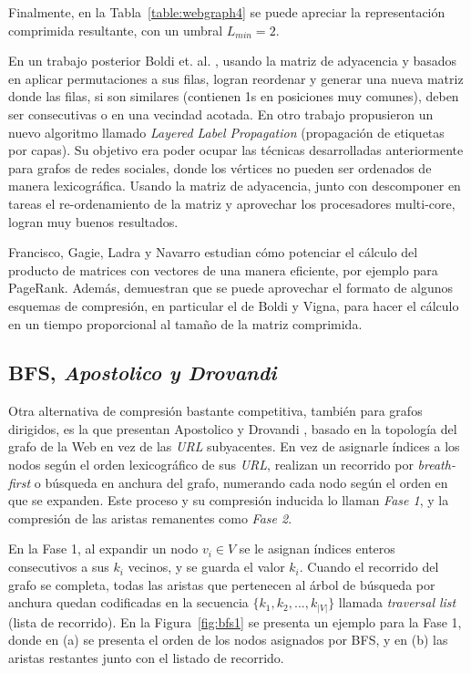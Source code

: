 Finalmente, en la Tabla~\ref{table:webgraph4} se puede apreciar la representación comprimida resultante, con un umbral $L_{min} = 2$. 

En un trabajo posterior Boldi et. al. \cite{boldi2009permuting}, usando la matriz de adyacencia y basados en aplicar permutaciones a sus filas, logran reordenar y generar una nueva matriz donde las filas, si son similares (contienen 1s en posiciones muy comunes), deben ser consecutivas o en una vecindad acotada. En otro trabajo propusieron un nuevo algoritmo llamado \textit{Layered Label Propagation} \cite{boldi2011layered} (propagación de etiquetas por capas). Su objetivo era poder ocupar las técnicas desarrolladas anteriormente para grafos de redes sociales, donde los vértices no pueden ser ordenados de manera lexicográfica. Usando la matriz de adyacencia, junto con descomponer en tareas el re-ordenamiento de la matriz y aprovechar los procesadores multi-core, logran muy buenos resultados.

Francisco, Gagie, Ladra y Navarro \cite{francisco2018exploiting} estudian cómo potenciar el cálculo del producto de matrices con vectores de una manera eficiente, por ejemplo para PageRank\cite{page1999pagerank}.  Además, demuestran que se puede aprovechar el formato de algunos esquemas de compresión, en particular el de Boldi y Vigna, para hacer el cálculo en un tiempo proporcional al tamaño de la matriz comprimida.


\subsection{BFS, \textit{Apostolico y Drovandi}}
Otra alternativa de compresión bastante competitiva, también para grafos dirigidos, es la que presentan Apostolico y Drovandi \cite{apostolico2009graph}, basado en la topología del grafo de la Web en vez de las \textit{URL} subyacentes. En vez de asignarle índices a los nodos según el orden lexicográfico de sus \textit{URL}, realizan un recorrido por \textit{breath-first} o búsqueda en anchura del grafo, numerando cada nodo según el orden en que se expanden. Este proceso y su compresión inducida lo llaman \textit{Fase 1}, y la compresión de las aristas remanentes como \textit{Fase 2}.

En la Fase 1, al expandir un nodo $v_{i} \in V$ se le asignan índices enteros consecutivos a sus $k_{i}$ vecinos, y se guarda el valor $k_{i}$. Cuando el recorrido del grafo se completa, todas las aristas que pertenecen al árbol de búsqueda por anchura quedan codificadas en la secuencia $\{k_{1}, k_{2}, ..., k_{|V|}\}$ llamada \textit{traversal list} (lista de recorrido). En la Figura~\ref{fig:bfs1} se presenta un ejemplo para la Fase 1, donde en (a) se presenta el orden de los nodos asignados por BFS, y en (b) las aristas restantes junto con el listado de recorrido.

